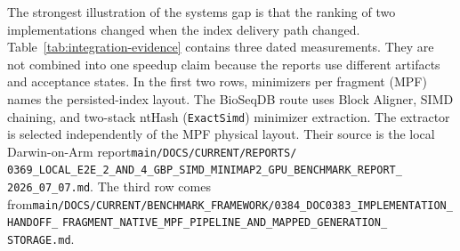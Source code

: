 The strongest illustration of the systems gap is that the ranking of two
implementations changed when the index delivery path changed.
Table~\ref{tab:integration-evidence} contains three dated measurements.  They
are not combined into one speedup claim because the reports use different
artifacts and acceptance states.  In the first two rows, minimizers per
fragment (MPF) names the persisted-index layout.  The BioSeqDB route uses
Block Aligner, SIMD chaining, and two-stack ntHash
(\texttt{ExactSimd}) minimizer extraction.  The extractor is selected
independently of the MPF physical layout.  Their source is the local
Darwin-on-Arm report\linebreak[4]
\texttt{main/DOCS/CURRENT/REPORTS/}\allowbreak%
\texttt{0369\_LOCAL\_E2E\_2\_AND\_4\_GBP\_}\linebreak[4]%
\texttt{SIMD\_MINIMAP2\_GPU\_BENCHMARK\_REPORT\_}\allowbreak%
\texttt{2026\_07\_07.md}.
The third row comes from\linebreak[4]
\texttt{main/DOCS/CURRENT/BENCHMARK\_FRAMEWORK/}\linebreak[4]%
\texttt{0384\_DOC0383\_IMPLEMENTATION\_HANDOFF\_}\allowbreak%
\texttt{FRAGMENT\_NATIVE\_}\linebreak[4]%
\texttt{MPF\_PIPELINE\_AND\_MAPPED\_GENERATION\_}\allowbreak%
\texttt{STORAGE.md}.

